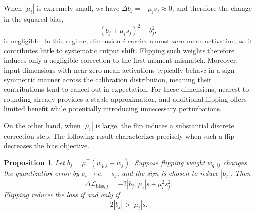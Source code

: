 \documentclass[table, 11pt]{article}
\newtheorem{proposition}{Proposition}
\begin{document}
When $|\mu_i|$ is extremely small, we have $\Delta b_j = \pm \mu_i s_j \approx 0$,
and therefore the change in the squared bias,
\begin{equation}
(b_j \pm \mu_i s_j)^2 - b_j^2,
\end{equation}
is negligible. In this regime, dimension $i$ carries almost zero mean activation,
so it contributes little to systematic output shift.
Flipping such weights therefore induces only a negligible correction to the first-moment mismatch. Moreover, input dimensions with near-zero mean activations typically behave in a sign-symmetric manner across the calibration distribution, meaning their contributions tend to cancel out in expectation. For these dimensions, nearest-to-rounding already provides a stable approximation, and additional flipping offers limited benefit while potentially introducing unnecessary perturbations.

On the other hand, when $|\mu_i|$ is large, the flip induces a substantial discrete correction step. The following result characterizes precisely when such a flip decreases the bias objective.

\begin{proposition}
Let $b_j = \mu^\top (w_{q,j} - w_j)$.
Suppose flipping weight $w_{q,ij}$ changes the quantization error
by $e_i \rightarrow e_i \pm s_j$, and the sign is chosen to reduce $|b_j|$.
Then
\begin{equation}
\Delta \mathcal{L}_{\text{bias},j}
=
- 2 |b_j| |\mu_i| s + \mu_i^2 s_j^2.
\end{equation}
Flipping reduces the loss if and only if
\begin{equation}
2 |b_j| > |\mu_i| s.
\end{equation}
\end{proposition}
\end{document}
